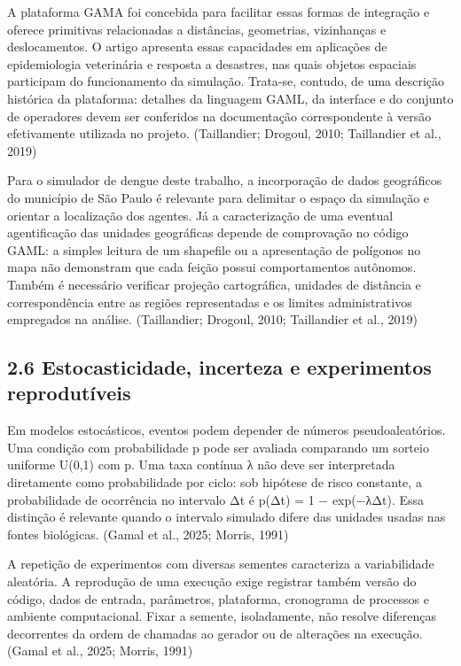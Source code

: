 A plataforma GAMA foi concebida para facilitar essas formas de
integração e oferece primitivas relacionadas a distâncias, geometrias,
vizinhanças e deslocamentos. O artigo apresenta essas capacidades em
aplicações de epidemiologia veterinária e resposta a desastres, nas
quais objetos espaciais participam do funcionamento da simulação.
Trata-se, contudo, de uma descrição histórica da plataforma: detalhes da
linguagem GAML, da interface e do conjunto de operadores devem ser
conferidos na documentação correspondente à versão efetivamente
utilizada no projeto. (Taillandier; Drogoul, 2010; Taillandier et al.,
2019)

Para o simulador de dengue deste trabalho, a incorporação de dados
geográficos do município de São Paulo é relevante para delimitar o
espaço da simulação e orientar a localização dos agentes. Já a
caracterização de uma eventual agentificação das unidades geográficas
depende de comprovação no código GAML: a simples leitura de um shapefile
ou a apresentação de polígonos no mapa não demonstram que cada feição
possui comportamentos autônomos. Também é necessário verificar projeção
cartográfica, unidades de distância e correspondência entre as regiões
representadas e os limites administrativos empregados na análise.
(Taillandier; Drogoul, 2010; Taillandier et al., 2019)

\subsection{2.6 Estocasticidade, incerteza e experimentos
reprodutíveis}\label{estocasticidade-incerteza-e-experimentos-reprodutuxedveis}

Em modelos estocásticos, eventos podem depender de números
pseudoaleatórios. Uma condição com probabilidade p pode ser avaliada
comparando um sorteio uniforme U(0,1) com p. Uma taxa contínua λ não
deve ser interpretada diretamente como probabilidade por ciclo: sob
hipótese de risco constante, a probabilidade de ocorrência no intervalo
Δt é p(Δt) = 1 − exp(−λΔt). Essa distinção é relevante quando o
intervalo simulado difere das unidades usadas nas fontes biológicas.
(Gamal et al., 2025; Morris, 1991)

A repetição de experimentos com diversas sementes caracteriza a
variabilidade aleatória. A reprodução de uma execução exige registrar
também versão do código, dados de entrada, parâmetros, plataforma,
cronograma de processos e ambiente computacional. Fixar a semente,
isoladamente, não resolve diferenças decorrentes da ordem de chamadas ao
gerador ou de alterações na execução. (Gamal et al., 2025; Morris, 1991)


